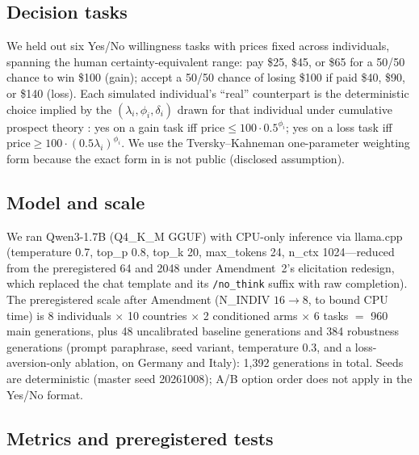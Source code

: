 \documentclass[10pt,letterpaper]{article}
\begin{document}
\subsection{Decision tasks}

We held out six Yes/No willingness tasks with prices fixed across
individuals, spanning the human certainty-equivalent range: pay \$25, \$45,
or \$65 for a 50/50 chance to win \$100 (gain); accept a 50/50 chance of
losing \$100 if paid \$40, \$90, or \$140 (loss). Each simulated
individual's ``real'' counterpart is the deterministic choice implied by the
$(\lambda_i,\phi_i,\delta_i)$ drawn for that individual under cumulative
prospect theory \citep{kahneman1979,tversky1992}: yes on a gain task iff
$\mathrm{price} \le 100\cdot0.5^{\phi_i}$; yes on a loss task iff
$\mathrm{price} \ge 100\cdot(0.5\lambda_i)^{\phi_i}$. We use the
Tversky--Kahneman one-parameter weighting form because the exact form in
\citet{rieger2017} is not public (disclosed assumption).

\subsection{Model and scale}

We ran Qwen3-1.7B (Q4\_K\_M GGUF) with CPU-only inference via llama.cpp
(temperature 0.7, top\_p 0.8, top\_k 20, max\_tokens 24, n\_ctx 1024---reduced
from the preregistered 64 and 2048 under Amendment~2's elicitation redesign,
which replaced the chat template and its \texttt{/no\_think} suffix with raw
completion). The preregistered scale after Amendment (N\_INDIV $16\to8$,
to bound CPU time) is 8 individuals $\times$ 10 countries $\times$ 2
conditioned arms $\times$ 6 tasks $=$ 960 main generations, plus 48
uncalibrated baseline generations and 384 robustness generations (prompt
paraphrase, seed variant, temperature 0.3, and a loss-aversion-only
ablation, on Germany and Italy): 1,392 generations in total. Seeds are
deterministic (master seed 20261008); A/B option order does not apply in
the Yes/No format.

\subsection{Metrics and preregistered tests}
\end{document}

